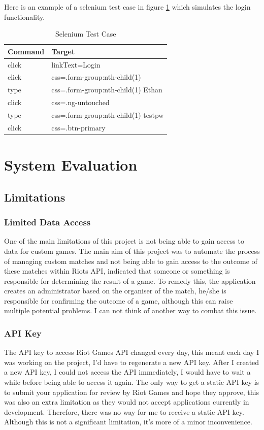 Here is an example of a selenium test case in figure \ref{tikz:seleniumtc} which simulates the login functionality.
\begin{table}[h]
	\centering
	\begin{tabular}{ll}
		\toprule
		Command & Target \\
		\midrule
		click  & linkText=Login   						\\
		click  & css=.form-group:nth-child(1)   		\\
		type   & css=.form-group:nth-child(1) Ethan   	\\
		click  & css=.ng-untouched   					\\
		type   & css=.form-group:nth-child(1) testpw	\\
		click  & css=.btn-primary    					\\
		\bottomrule    
	\end{tabular}
	\caption{Selenium Test Case}
	\label{tikz:seleniumtc}
\end{table}

\chapter{System Evaluation}
\section{Limitations}
\subsection{Limited Data Access}
One of the main limitations of this project is not being able to gain access to data for custom games. The main aim of this project was to automate the process of managing custom matches and not being able to gain access to the outcome of these matches within Riots API, indicated that someone or something is responsible for determining the result of a game. To remedy this, the application creates an administrator based on the organiser of the match, he/she is responsible for confirming the outcome of a game, although this can raise multiple potential problems. I can not think of another way to combat this issue.
\subsection{API Key}
The API key to access Riot Games API changed every day, this meant each day I was working on the project, I'd have to regenerate a new API key. After I created a new API key, I could not access the API immediately, I would have to wait a while before being able to access it again. The only way to get a static API key is to submit your application for review by Riot Games and hope they approve, this was also an extra limitation as they would not accept applications currently in development. Therefore, there was no way for me to receive a static API key. Although this is not a significant limitation, it's more of a minor inconvenience.

